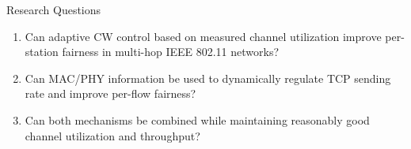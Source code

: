 \begin{frame}{Research Questions}

\begin{enumerate}
    \item Can adaptive CW control based on measured channel utilization improve per-station fairness in multi-hop IEEE 802.11 networks?

    \item Can MAC/PHY information be used to dynamically regulate TCP sending rate and improve per-flow fairness?

    \item Can both mechanisms be combined while maintaining reasonably good channel utilization and throughput?
\end{enumerate}
\end{frame}
